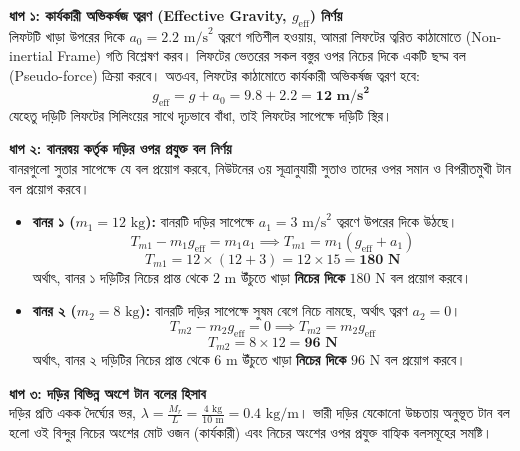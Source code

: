 \documentclass[12pt, a4paper]{article}
\begin{document}
\begin{tcolorbox}[solutionbox={সমাধান (Solution)}]
\noindent
\textbf{ধাপ ১: কার্যকারী অভিকর্ষজ ত্বরণ (Effective Gravity, $g_{\text{eff}}$) নির্ণয়} \\
লিফটটি খাড়া উপরের দিকে $a_0 = 2.2\text{ m/s}^2$ ত্বরণে গতিশীল হওয়ায়, আমরা লিফটের ত্বরিত কাঠামোতে (Non-inertial Frame) গতি বিশ্লেষণ করব। লিফটের ভেতরের সকল বস্তুর ওপর নিচের দিকে একটি ছদ্ম বল (Pseudo-force) ক্রিয়া করবে। 
অতএব, লিফটের কাঠামোতে কার্যকারী অভিকর্ষজ ত্বরণ হবে:
\[ g_{\text{eff}} = g + a_0 = 9.8 + 2.2 = \mathbf{12\text{ m/s}^2} \]
যেহেতু দড়িটি লিফটের সিলিংয়ের সাথে দৃঢ়ভাবে বাঁধা, তাই লিফটের সাপেক্ষে দড়িটি স্থির।

\vspace{0.5em}
\noindent
\textbf{ধাপ ২: বানরদ্বয় কর্তৃক দড়ির ওপর প্রযুক্ত বল নির্ণয়} \\
বানরগুলো সুতার সাপেক্ষে যে বল প্রয়োগ করবে, নিউটনের ৩য় সূত্রানুযায়ী সুতাও তাদের ওপর সমান ও বিপরীতমুখী টান বল প্রয়োগ করবে।
\begin{itemize}[leftmargin=*, parsep=0.5ex]
    \item \textbf{বানর ১ ($m_1 = 12\text{ kg}$):} বানরটি দড়ির সাপেক্ষে $a_1 = 3\text{ m/s}^2$ ত্বরণে উপরের দিকে উঠছে।
    \[ T_{m1} - m_1 g_{\text{eff}} = m_1 a_1 \implies T_{m1} = m_1(g_{\text{eff}} + a_1) \]
    \[ T_{m1} = 12 \times (12 + 3) = 12 \times 15 = \mathbf{180\text{ N}} \]
    অর্থাৎ, বানর ১ দড়িটির নিচের প্রান্ত থেকে $2\text{ m}$ উঁচুতে খাড়া \textbf{নিচের দিকে} $180\text{ N}$ বল প্রয়োগ করবে।
    
    \item \textbf{বানর ২ ($m_2 = 8\text{ kg}$):} বানরটি দড়ির সাপেক্ষে সুষম বেগে নিচে নামছে, অর্থাৎ ত্বরণ $a_2 = 0$।
    \[ T_{m2} - m_2 g_{\text{eff}} = 0 \implies T_{m2} = m_2 g_{\text{eff}} \]
    \[ T_{m2} = 8 \times 12 = \mathbf{96\text{ N}} \]
    অর্থাৎ, বানর ২ দড়িটির নিচের প্রান্ত থেকে $6\text{ m}$ উঁচুতে খাড়া \textbf{নিচের দিকে} $96\text{ N}$ বল প্রয়োগ করবে।
\end{itemize}

\vspace{0.5em}
\noindent
\textbf{ধাপ ৩: দড়ির বিভিন্ন অংশে টান বলের হিসাব} \\
দড়ির প্রতি একক দৈর্ঘ্যের ভর, $\lambda = \frac{M_r}{L} = \frac{4\text{ kg}}{10\text{ m}} = 0.4\text{ kg/m}$। ভারী দড়ির যেকোনো উচ্চতায় অনুভূত টান বল হলো ওই বিন্দুর নিচের অংশের মোট ওজন (কার্যকারী) এবং নিচের অংশের ওপর প্রযুক্ত বাহ্যিক বলসমূহের সমষ্টি।


\end{tcolorbox}
\end{document}
